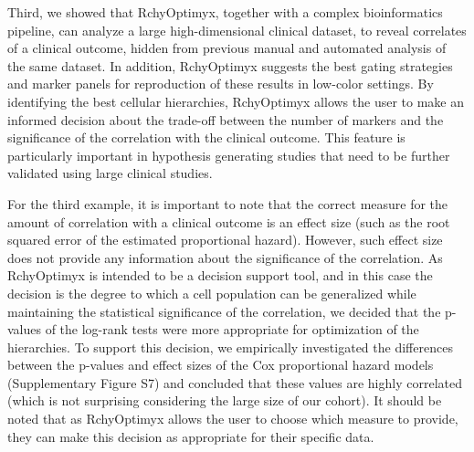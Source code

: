 Third, we showed that RchyOptimyx, together with a complex bioinformatics pipeline, can analyze a large high-dimensional clinical dataset, to reveal correlates of a clinical outcome, hidden from previous manual and automated analysis of the same dataset.
In addition, RchyOptimyx suggests the best gating strategies and marker panels for reproduction of these results in low-color settings.
By identifying the best cellular hierarchies, RchyOptimyx allows the user to make an informed decision about the trade-off between the number of markers and the significance of the correlation with the clinical outcome.
This feature is particularly important in hypothesis generating studies that need to be further validated using large clinical studies.

For the third example, it is important to note that the correct measure for the amount of correlation with a clinical outcome is an effect size (such as the root squared error of the estimated proportional hazard). 
However, such effect size does not provide any information about the significance of the correlation. 
As RchyOptimyx is intended to be a decision support tool, and in this case the decision is the degree to which a cell population can be generalized while maintaining the statistical significance of the correlation, we decided that the p-values of the log-rank tests were more appropriate for optimization of the hierarchies.
To support this decision, we empirically investigated the differences between the p-values and effect sizes of the Cox proportional hazard models (Supplementary Figure S7) and concluded that these values are highly correlated (which is not surprising considering the large size of our cohort).
It should be noted that as RchyOptimyx allows the user to choose which measure to provide, they can make this decision as appropriate for their specific data.



